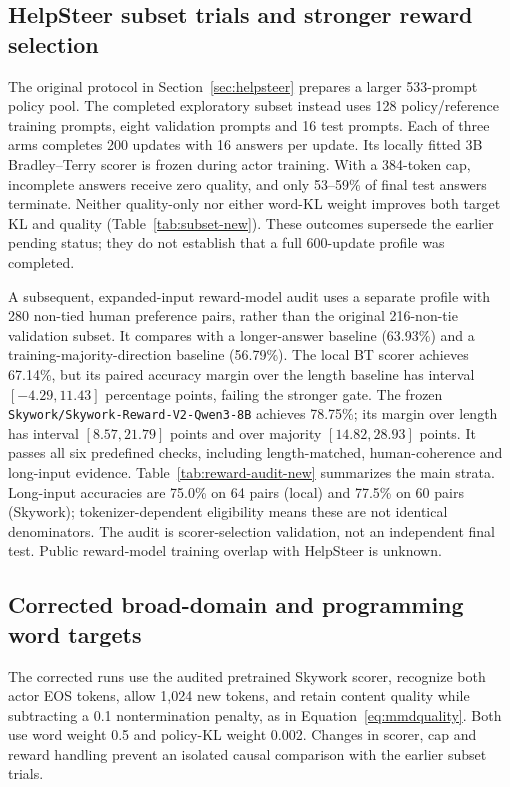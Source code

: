 \subsection{HelpSteer subset trials and stronger reward selection}
The original protocol in Section~\ref{sec:helpsteer} prepares a larger
533-prompt policy pool. The completed exploratory subset instead uses
128 policy/reference training prompts, eight validation prompts and 16
test prompts. Each of three arms completes 200 updates with 16 answers
per update. Its locally fitted 3B Bradley--Terry scorer is frozen during
actor training. With a 384-token cap, incomplete answers receive zero
quality, and only 53--59\% of final test answers terminate.
Neither quality-only nor either word-KL weight improves both target KL
and quality (Table~\ref{tab:subset-new}). These outcomes supersede the
earlier pending status; they do not establish that a full 600-update
profile was completed.


A subsequent, expanded-input reward-model audit uses a separate profile
with 280 non-tied human preference pairs, rather than the original
216-non-tie validation subset. It compares with a longer-answer baseline (63.93\%) and
a training-majority-direction baseline (56.79\%). The local BT scorer
achieves 67.14\%, but its paired accuracy margin over the length baseline
has interval $[-4.29,11.43]$ percentage points, failing the stronger gate.
The frozen \texttt{Skywork/Skywork-Reward-V2-Qwen3-8B} achieves 78.75\%;
its margin over length has interval $[8.57,21.79]$ points and over
majority $[14.82,28.93]$ points. It passes all six predefined checks,
including length-matched, human-coherence and long-input evidence.
Table~\ref{tab:reward-audit-new} summarizes the main strata.
Long-input accuracies are 75.0\% on 64 pairs (local) and 77.5\% on 60
pairs (Skywork); tokenizer-dependent eligibility means these are not
identical denominators. The audit is scorer-selection validation,
not an independent final test. Public reward-model training overlap
with HelpSteer is unknown.


\subsection{Corrected broad-domain and programming word targets}
The corrected runs use the audited pretrained Skywork scorer, recognize
both actor EOS tokens, allow 1,024 new tokens, and retain content quality
while subtracting a 0.1 nontermination penalty, as in
Equation~\eqref{eq:mmdquality}. Both use word weight 0.5 and policy-KL
weight 0.002. Changes in scorer, cap and reward handling prevent an
isolated causal comparison with the earlier subset trials.

